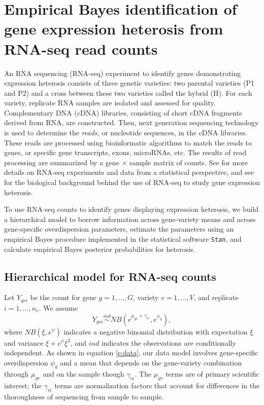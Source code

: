 \documentclass[useAMS,usenatbib,referee]{biom}
\begin{document}
\section{Empirical Bayes identification of gene expression heterosis from RNA-seq read counts}
\label{s:method}

An RNA sequencing (RNA-seq) experiment to identify genes demonstrating expression heterosis consists of three genetic varieties: two parental varieties (P1 and P2) and a cross between these two varieties called the hybrid (H). For each variety, replicate RNA samples are isolated and assessed for quality. Complementary DNA (cDNA) libraries, consisting of short cDNA fragments derived from RNA, are constructed. Then, next generation sequencing technology is used to determine the \emph{reads}, or nucleotide sequences, in the cDNA libraries. These reads are processed using bioinformatic algorithms to match the reads to genes, or specific gene transcripts, exons, microRNAs, etc. The results of read processing are summarized by a gene $\times$ sample matrix of counts. See \cite{datta2014statistical} for more details on RNA-seq experiments and data from a statistical perspective, and see \cite{paschold2012complementation} for the biological background behind the use of RNA-seq to study gene expression heterosis.

To use RNA-seq counts to identify genes displaying expression heterosis, we build a hierarchical model to borrow information across gene-variety means and across gene-specific overdispersion parameters, estimate the parameters using an empirical Bayes procedure implemented in the statistical software {\tt Stan}, and calculate empirical Bayes posterior probabilities for heterosis. 


\subsection{Hierarchical model for RNA-seq counts}
\label{s:model}

Let $Y_{gvi}$ be the count for gene $g=1,\ldots,G$, variety $v=1,\ldots,V$, and replicate $i=1,\ldots,n_v$.  We assume
\begin{equation} 
Y_{gvi} \stackrel{ind}{\sim} NB\left(e^{\mu_{gv}+\gamma_{vi}},e^{\psi_g}\right), 
\label{e:data}
\end{equation}
where $NB(\xi,e^\psi)$ indicates a negative binomial distribution with expectation $\xi$ and variance $\xi+e^\psi\xi^2$, and $ind$ indicates the observations are conditionally independent.  As shown in equation \eqref{e:data}, our data model involves gene-specific overdispersion $\psi_g$ and a mean that depends on the gene-variety combination through $\mu_{gv}$ and on the sample though  $\gamma_{vi}$.  The $\mu_{gv}$ terms are of primary scientific interest; the $\gamma_{vi}$ terms are normalization factors that account for differences in the thoroughness of sequencing from sample to sample. 
\end{document}
